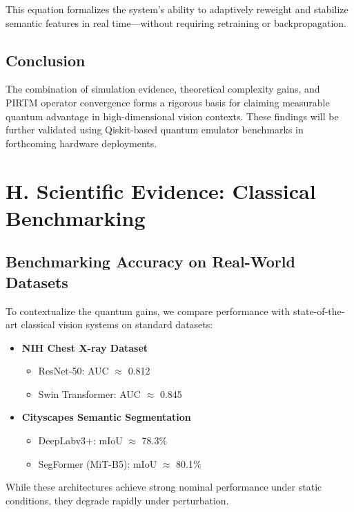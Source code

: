 \documentclass[12pt]{article}
\theoremstyle{plain}
\begin{document}
This equation formalizes the system’s ability to adaptively reweight and stabilize semantic features in real time—without requiring retraining or backpropagation.

\subsection*{Conclusion}

The combination of simulation evidence, theoretical complexity gains, and PIRTM operator convergence forms a rigorous basis for claiming measurable quantum advantage in high-dimensional vision contexts. These findings will be further validated using Qiskit-based quantum emulator benchmarks in forthcoming hardware deployments.
\section*{H. Scientific Evidence: Classical Benchmarking}

\subsection*{Benchmarking Accuracy on Real-World Datasets}

To contextualize the quantum gains, we compare performance with state-of-the-art classical vision systems on standard datasets:

\begin{itemize}
    \item \textbf{NIH Chest X-ray Dataset} \cite{nih-chestxray}
    \begin{itemize}
        \item ResNet-50: AUC $\approx$ 0.812
        \item Swin Transformer: AUC $\approx$ 0.845
    \end{itemize}

    \item \textbf{Cityscapes Semantic Segmentation} \cite{cordts2016cityscapes}
    \begin{itemize}
        \item DeepLabv3+: mIoU $\approx$ 78.3\%
        \item SegFormer (MiT-B5): mIoU $\approx$ 80.1\%
    \end{itemize}
\end{itemize}

While these architectures achieve strong nominal performance under static conditions, they degrade rapidly under perturbation.
\end{document}
